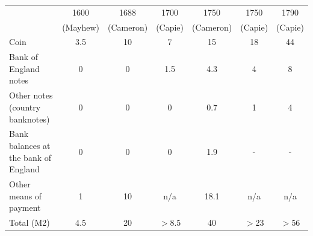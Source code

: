 
\begin{table}[htbp]
  \centering
  \small
    \begin{tabularx}{\textwidth}{Xcccccc}
& 1600 & 1688 & 1700 & 1750 & 1750 & 1790\\
& (Mayhew) & (Cameron) & (Capie) & (Cameron) & (Capie) & (Capie)\\
    \hline
Coin & 3.5 & 10 & 7 & 15 & 18 & 44 \\
    
Bank of England notes & 0 & 0 & 1.5 & 4.3 & 4 & 8 \\
    
Other notes (country banknotes) & 0 & 0 & 0 & 0.7 & 1 & 4 \\
    
Bank balances at the bank of England & 0 & 0 & 0 & 1.9 & - & - \\
    
Other means of payment & 1 & 10 & n/a & 18.1 &  n/a  &  n/a  \\
    \hline
Total (M2) & 4.5 & 20 & $>$8.5 & 40 & $>$23 & $>$56 \\  
    \hline
    \end{tabularx}%

  \label{tablemoneysupply}%
\end{table}%
